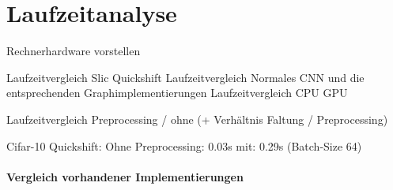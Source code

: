 \section{Laufzeitanalyse}
\label{laufzeitanalyse}

Rechnerhardware vorstellen

Laufzeitvergleich Slic Quickshift
Laufzeitvergleich Normales CNN und die entsprechenden Graphimplementierungen
Laufzeitvergleich CPU GPU

Laufzeitvergleich Preprocessing / ohne (+ Verhältnis Faltung / Preprocessing)

Cifar-10 Quickshift: Ohne Preprocessing: 0.03s
mit: 0.29s (Batch-Size 64)



\paragraph{Vergleich \bzgl{} vorhandener Implementierungen}
\label{vergleich_laufzeit}



